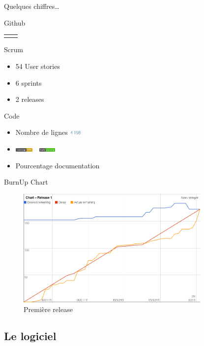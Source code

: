 \documentclass{beamer}
\begin{document}
\begin{frame}{Quelques chiffres\ldots}
\begin{block}{Github}
\begin{tabular}{cc}
\begin{minipage}{0.5\textwidth}
			\end{minipage}
		\end{tabular}
	\end{block}
\pause
	\begin{block}{Scrum}
		\begin{itemize}
			\item 54 User stories
			\item 6 sprints
			\item 2 releases
		\end{itemize}
	\end{block}
\pause
	\begin{block}{Code}
		\begin{itemize}
			\item Nombre de lignes \includegraphics[height=9px]{images/stats/nblines.jpg}
			\item \includegraphics[height=7px]{images/coverage.png}~~\includegraphics[height=7px]{images/build.png}
			\item Pourcentage documentation
		\end{itemize}
	\end{block}

\end{frame}

\begin{frame}{BurnUp Chart}
	\begin{figure}[H]
		\includegraphics[width=9.5cm]{images/release1Chart.png}
		\caption{Première release}
	\end{figure}
\end{frame}

\subsection{Le logiciel}
\begin{frame}
\end{frame}
\end{document}
